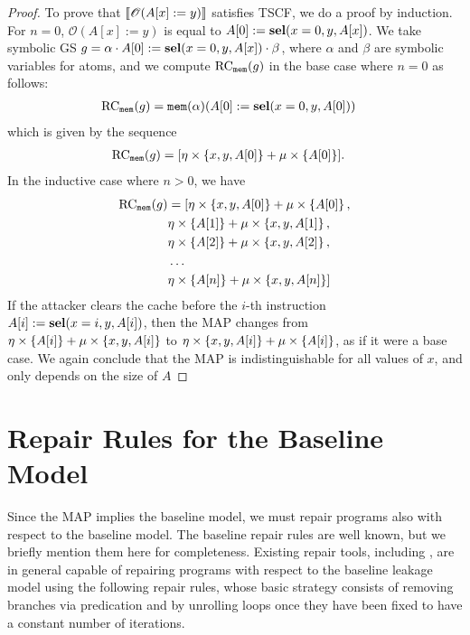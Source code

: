 \begin{proof}
    To prove that $\llbracket \mathscr{O}(A[x]:=y)\rrbracket$ satisfies TSCF, we do a proof by induction.
    For $n=0$, $\mathscr{O}(A[x]:=y)$ is equal to $A[0]:=\textbf{sel}(x=0,y,A[x])$. We take symbolic GS $g=\alpha\cdot A[0]:=\textbf{sel}(x=0,y,A[x])\cdot \beta$, where $\alpha$ and $\beta$ are symbolic variables for atoms, and we compute $\text{RC}_{\texttt{mem}}(g)$ in the base case where $n=0$ as follows:
    \begin{align*}
        \text{RC}_{\texttt{mem}}(g)
        &=\texttt{mem}(\alpha)(A[0]:=\textbf{sel}(x=0,y,A[0]))
    \end{align*}
which is given by the sequence
    \begin{align*}
        \text{RC}_{\texttt{mem}}(g)&=[\eta\times\left\{x,y,A[0]\right\}+\mu\times \left\{A[0]\right\}].
    \end{align*}
In the inductive case where $n>0$, we have
    \begin{align*}
        \text{RC}_{\texttt{mem}}(g)&=[\eta\times\left\{x,y,A[0]\right\}+\mu\times \left\{A[0]\right\},\\
        &\eta\times\left\{A[1]\right\}+\mu\times \left\{x,y,A[1]\right\},\\
        &\eta\times\left\{A[2]\right\}+\mu\times \left\{x,y,A[2]\right\},\\
        &\ldots\\
        &\eta\times\left\{A[n]\right\}+\mu\times \left\{x,y,A[n]\right\}]
    \end{align*}
If the attacker clears the cache before the $i$-th instruction $A[i]:=\textbf{sel}(x=i,y,A[i])$, then the MAP changes from $\eta\times\left\{A[i]\right\}+\mu\times \left\{x,y,A[i]\right\}$ to $\eta\times\left\{x,y,A[i]\right\}+\mu\times \left\{A[i]\right\}$, as if it were a base case. We again conclude that the MAP is indistinguishable for all values of $x$, and only depends on the size of $A$
%     
    
\end{proof}



\section{Repair Rules for the Baseline Model}
Since the MAP implies the baseline model, we must repair programs also with respect to the baseline model. The baseline repair rules are well known, but we briefly mention them here for completeness. Existing repair tools, including \cite{Racoon,SCEliminator,MSESC}, are in general capable of repairing programs with respect to the baseline leakage model using the following repair rules, whose basic strategy consists of removing branches via {predication} and by unrolling loops once they have been fixed to have a constant number of iterations. 

